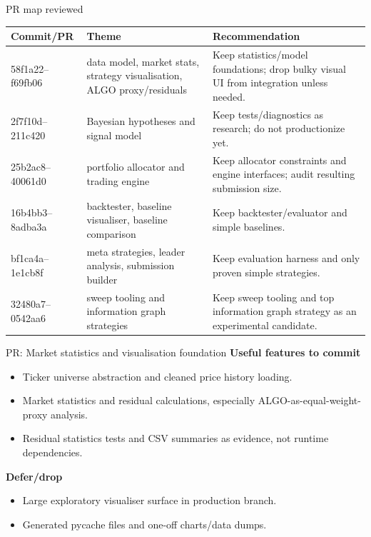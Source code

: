 \documentclass[aspectratio=169]{beamer}
\begin{document}
\begin{frame}{PR map reviewed}
\small
\begin{tabular}{p{}p{}p{}}
\toprule
Commit/PR & Theme & Recommendation \\
\midrule
58f1a22--f69fb06 & data model, market stats, strategy visualisation, ALGO proxy/residuals & Keep statistics/model foundations; drop bulky visual UI from integration unless needed. \\
2f7f10d--211c420 & Bayesian hypotheses and signal model & Keep tests/diagnostics as research; do not productionize yet. \\
25b2ac8--40061d0 & portfolio allocator and trading engine & Keep allocator constraints and engine interfaces; audit resulting submission size. \\
16b4bb3--8adba3a & backtester, baseline visualiser, baseline comparison & Keep backtester/evaluator and simple baselines. \\
bf1ca4a--1e1cb8f & meta strategies, leader analysis, submission builder & Keep evaluation harness and only proven simple strategies. \\
32480a7--0542aa6 & sweep tooling and information graph strategies & Keep sweep tooling and top information graph strategy as an experimental candidate. \\
\bottomrule
\end{tabular}
\end{frame}

\begin{frame}{PR: Market statistics and visualisation foundation}
\textbf{Useful features to commit}
\begin{itemize}
  \item Ticker universe abstraction and cleaned price history loading.
  \item Market statistics and residual calculations, especially ALGO-as-equal-weight-proxy analysis.
  \item Residual statistics tests and CSV summaries as evidence, not runtime dependencies.
\end{itemize}
\textbf{Defer/drop}
\begin{itemize}
  \item Large exploratory visualiser surface in production branch.
  \item Generated pycache files and one-off charts/data dumps.
\end{itemize}
\end{frame}
\end{document}

